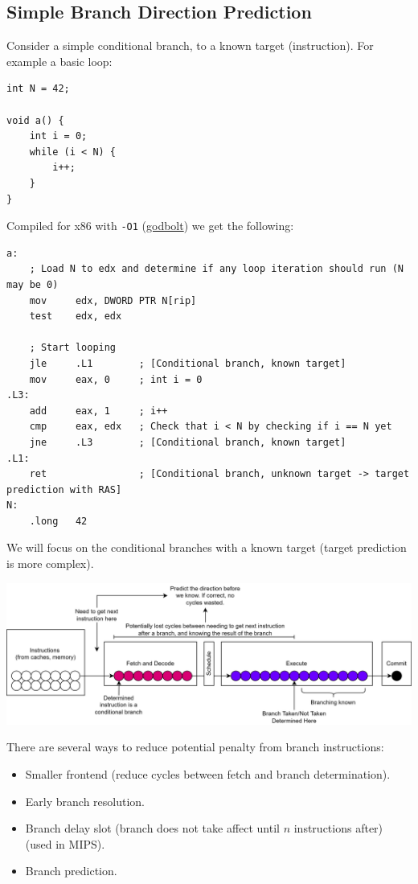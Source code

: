 \subsection{Simple Branch Direction Prediction}
Consider a simple conditional branch, to a known target (instruction). For example a basic loop:
\begin{verbatim}
int N = 42;

void a() {
    int i = 0;
    while (i < N) {
        i++;
    }
}
\end{verbatim}
Compiled for x86 with \texttt{-O1} (\href{https://godbolt.org/z/1xedvGbx9}{godbolt}) we get the following:
\begin{verbatim}
a:
    ; Load N to edx and determine if any loop iteration should run (N may be 0)
    mov     edx, DWORD PTR N[rip]
    test    edx, edx

    ; Start looping
    jle     .L1        ; [Conditional branch, known target]
    mov     eax, 0     ; int i = 0
.L3:
    add     eax, 1     ; i++
    cmp     eax, edx   ; Check that i < N by checking if i == N yet
    jne     .L3        ; [Conditional branch, known target]
.L1:
    ret                ; [Conditional branch, unknown target -> target prediction with RAS]
N:
    .long   42
\end{verbatim}

We will focus on the conditional branches with a known target (target prediction is more complex).
\begin{center}
    \includegraphics[width=.9\textwidth]{modelling/images/branch_direction_prediction_motivation.drawio.png}
\end{center}
There are several ways to reduce potential penalty from branch instructions:
\begin{itemize}
    \item Smaller frontend (reduce cycles between fetch and branch determination).
    \item Early branch resolution.
    \item Branch delay slot (branch does not take affect until $n$ instructions after) (used in MIPS).
    \item Branch prediction.
\end{itemize}


